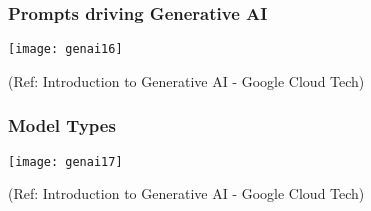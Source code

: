 
  
  




\begin{frame}[fragile]\frametitle{Prompts driving Generative AI}

\begin{center}
\texttt{[image: genai16]}
\end{center}


{\tiny (Ref: Introduction to Generative AI - Google Cloud Tech)}

\end{frame}


\begin{frame}[fragile]\frametitle{Model Types}

\begin{center}
\texttt{[image: genai17]}
\end{center}


{\tiny (Ref: Introduction to Generative AI - Google Cloud Tech)}

\end{frame}

